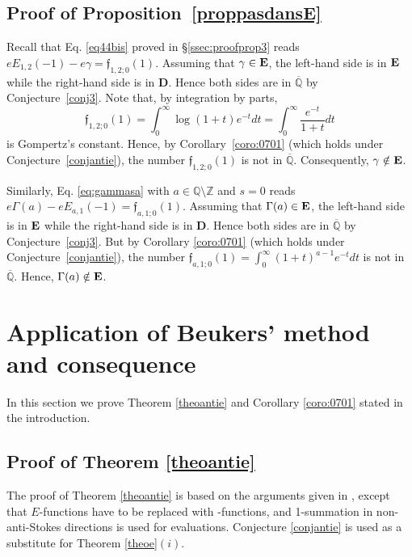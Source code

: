 \documentclass[reqno,12pt]{article}
\numberwithin{equation}{section}
\theoremstyle{remark}
\newcommand{\Qbar}{\overline{\mathbb Q}}
\newcommand{\tantie}{{\fontencoding{OT2}\fontfamily{wncyr}\selectfont\CYREREV}}
\newcommand{\antie}{\text{\tantie}}
\newcommand{\EE}{{\bf E}}
\newcommand{\fgo}{\mathfrak{f}}
\begin{document}
\subsection{Proof of Proposition~\ref{proppasdansE}}\label{subsec44}

 Recall that Eq. \eqref{eq44bis} proved in \S \ref{ssec:proofprop3} reads 
$
 eE_{1,2}(-1)- e\gamma=\fgo_{1,2;0}(1).
$
Assuming that $\gamma \in \EE$, the left-hand side is in $\EE$ while the right-hand side is in {\bf D}. Hence both sides are in $\Qbar$ by Conjecture~\ref{conj3}. Note that, by integration by parts,  
$$
\fgo_{1,2;0}(1) =\int_0^\infty \log(1+t)e^{-t}dt = \int_0^{\infty} \frac{e^{-t}}{1+t} dt
$$
is Gompertz's constant. 
Hence, by Corollary~\ref{coro:0701}  (which holds under Conjecture~\ref{conjantie}), the number $\fgo_{1,2;0}(1)$ is not in $\Qbar$. Consequently, $\gamma\notin \EE$.

\medskip

Similarly, Eq.  \eqref{eq:gammasa} with $a\in \mathbb Q\setminus \mathbb Z$ and $s=0$ reads 
$
e\Gamma(a)-eE_{a,1}(-1)=\fgo_{a,1;0}(1).$
Assuming that $\Gamma(a) \in \EE$, the left-hand side is in $\EE$ while the right-hand side is in {\bf D}. Hence both sides are in $\Qbar$ by Conjecture~\ref{conj3}. But by Corollary \ref{coro:0701} (which holds under Conjecture~\ref{conjantie}), the number $\fgo_{a,1;0}(1) = \int_0^\infty  (1+t)^{a-1} e^{-t}dt $ is not in $\Qbar$. Hence, $\Gamma(a)\notin \EE$.

 





\section{Application of Beukers' method and consequence} \label{sec5}

In this section we prove  Theorem \ref{theoantie} and Corollary \ref{coro:0701} stated in the introduction.

\subsection{Proof of Theorem \ref{theoantie}}\label{sec:proofsthm1}

The proof of Theorem \ref{theoantie} is based on the arguments given in \cite{beukers}, except that $E$-functions have to be replaced with \antie-functions, and 1-summation in non-anti-Stokes directions is used for evaluations. Conjecture \ref{conjantie} is used as a substitute for Theorem \ref{theoe}$(i)$.
\end{document}
